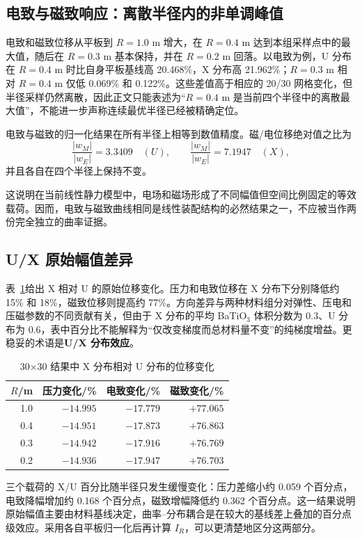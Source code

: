 \documentclass[UTF8,fontset=windows,11pt,a4paper]{ctexart}
\begin{document}
\subsection{电致与磁致响应：离散半径内的非单调峰值}

电致和磁致位移从平板到 $R=1.0$ m 增大，在 $R=0.4$ m 达到本组采样点中的最大值，随后在 $R=0.3$ m 基本保持，并在 $R=0.2$ m 回落。以电致为例，U 分布在 $R=0.4$ m 时比自身平板基线高 20.468\%，X 分布高 21.962\%；$R=0.3$ m 相对 $R=0.4$ m 仅低 0.069\% 和 0.122\%。这些差值高于相应的 20/30 网格变化，但半径采样仍然离散，因此正文只能表述为“$R=0.4$ m 是当前四个半径中的离散最大值”，不能进一步声称连续最优半径已经被精确定位。

电致与磁致的归一化结果在所有半径上相等到数值精度。磁/电位移绝对值之比为
\[
\frac{|w_M|}{|w_E|}=3.3409\quad(U),
\qquad
\frac{|w_M|}{|w_E|}=7.1947\quad(X),
\]
并且各自在四个半径上保持不变。

这说明在当前线性静力模型中，电场和磁场形成了不同幅值但空间比例固定的等效载荷。因而，电致与磁致曲线相同是线性装配结构的必然结果之一，不应被当作两份完全独立的曲率证据。

\subsection{U/X 原始幅值差异}

表~\ref{tab:x_u_effect}给出 X 相对 U 的原始位移变化。压力和电致位移在 X 分布下分别降低约 15\% 和 18\%，磁致位移则提高约 77\%。方向差异与两种材料组分对弹性、压电和压磁参数的不同贡献有关，但由于 X 分布的平均 BaTiO$_3$ 体积分数为 0.3、U 分布为 0.6，表中百分比不能解释为“仅改变梯度而总材料量不变”的纯梯度增益。更稳妥的术语是\textbf{U/X 分布效应}。

\begin{table}[H]
\centering
\caption{30$\times$30 结果中 X 分布相对 U 分布的位移变化}
\label{tab:x_u_effect}
\begin{tabular}{rrrr}
\toprule
$R$/m & 压力变化/\% & 电致变化/\% & 磁致变化/\% \\
\midrule
1.0 & $-14.995$ & $-17.779$ & $+77.065$ \\
0.4 & $-14.951$ & $-17.873$ & $+76.863$ \\
0.3 & $-14.942$ & $-17.916$ & $+76.769$ \\
0.2 & $-14.936$ & $-17.947$ & $+76.703$ \\
\bottomrule
\end{tabular}
\end{table}

三个载荷的 X/U 百分比随半径只发生缓慢变化：压力差缩小约 0.059 个百分点，电致降幅增加约 0.168 个百分点，磁致增幅降低约 0.362 个百分点。这一结果说明原始幅值主要由材料基线决定，曲率--分布耦合是在较大的基线差上叠加的百分点级效应。采用各自平板归一化后再计算 $I_R$，可以更清楚地区分这两部分。
\end{document}
